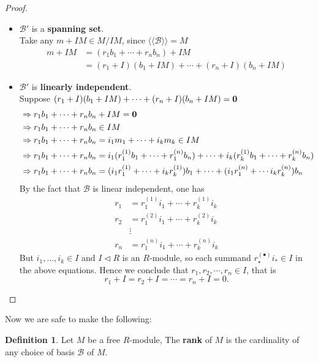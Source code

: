\documentclass[11pt,openany]{book}
\theoremstyle{plain}
\theoremstyle{definition}
\newtheorem{definition}[definition]{Definition}
\theoremstyle{remark}
\begin{document}
\begin{proof}
\bigskip
    \begin{itemize}
        \item $\mathcal{B}'$ is a {\bf spanning set}. \\
         Take any $m+IM\in M/IM$, since $\langle\langle\mathcal{B}\rangle\rangle = M$
            \begin{align*}
                m+IM&=(r_1b_1+\cdots+r_nb_n)+IM \\
                    &=(r_1+I)(b_1+IM)+\cdots+(r_n+I)(b_n+IM)
            \end{align*}
        \item $\mathcal{B}'$ is {\bf linearly independent}.\\
         Suppose $(r_1+I)(b_1+IM)+\cdots+(r_n+I)(b_n+IM)= {\bf 0}$
        \begin{align*}
            & \Rightarrow r_1b_1+\cdots+r_nb_n+IM={\bf 0} \\
            & \Rightarrow r_1b_1+\cdots+r_nb_n \in IM \\
            & \Rightarrow r_1b_1+\cdots+r_nb_n=i_1m_1+\cdots+i_km_k\in IM \\
            & \Rightarrow r_1b_1+\cdots+r_nb_n=i_1(r_1^{(1)}b_1+\cdots+r_1^{(n)}b_n)+\cdots +i_k(r_k^{(1)}b_1+\cdots+r_k^{(n)}b_n) \\
            & \Rightarrow r_1b_1+\cdots+r_nb_n=(i_1r_1^{(1)}+\cdots+i_kr_k^{(1)})b_1+\cdots+(i_1r_1^{(n)}+\cdots i_kr_k^{(n)})b_n
        \end{align*}
        By the fact that $\mathcal{B}$ is linear independent, one has
        \begin{align*}
             r_1 &=r_1^{(1)}i_1+\cdots+r_k^{(1)}i_k \\
             r_2 &=r_1^{(2)}i_1+\cdots+r_k^{(2)}i_k \\
             &\vdots \\
             r_n &=r_1^{(n)}i_1+\cdots+r_k^{(n)}i_k 
        \end{align*}
        But $i_1, \dots, i_k \in I$ and $I \lhd R$ is an $R$-module, so each summand $r_{\star}^{(\bullet)}i_{\ast} \in I$ in the above equations. Hence we conclude that $r_1,r_2,\cdots,r_n \in I$, that is 
        $$r_1+I=r_2+I=\cdots=r_n+I=0.$$
    \end{itemize}
\end{proof}

Now we are safe to make the following:
\begin{definition}
    Let $M$ be a free $R$-module, The {\bf rank} of $M$ is the cardinality of any choice of basis $\mathcal{B}$ of $M$.
\end{definition}
\end{document}
